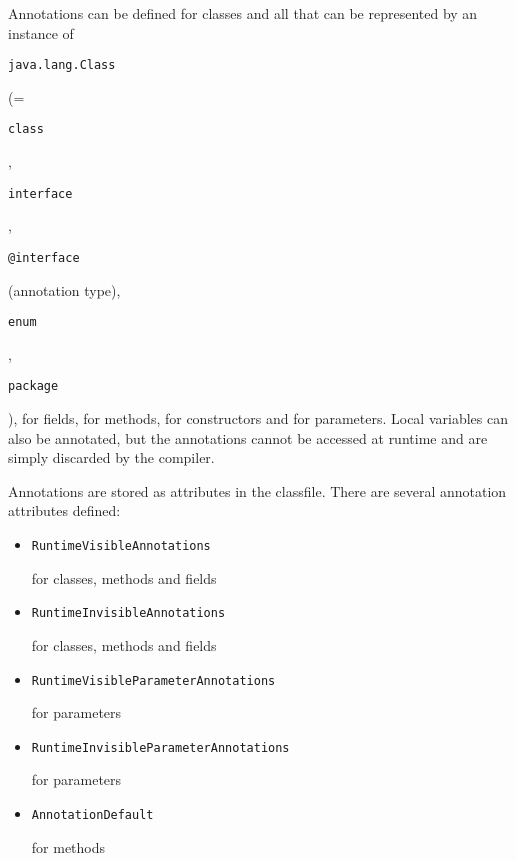 \documentclass[a4paper, 10pt, titlepage]{scrartcl} %
\begin{document}
Annotations can be defined for classes and all that can be represented by an
instance of \begin{scriptsize}\verb|java|\hspace{0.0pt}\verb|.|\hspace{0.0pt}\verb|lang|\hspace{0.0pt}\verb|.|\hspace{0.0pt}\verb|Class|\end{scriptsize} (=\begin{scriptsize}\verb|class|\end{scriptsize}, \begin{scriptsize}\verb|interface|\end{scriptsize},
\begin{scriptsize}\verb||\hspace{0.0pt}\verb|@|\hspace{0.0pt}\verb|interface|\end{scriptsize} (annotation type), \begin{scriptsize}\verb|enum|\end{scriptsize}, \begin{scriptsize}\verb|package|\end{scriptsize}), for fields, for
methods, for constructors and for parameters. Local variables can also be
annotated, but the annotations cannot be accessed at runtime and are simply
discarded by the compiler.

Annotations are stored as attributes in the classfile. There are several
annotation attributes defined:
\begin{itemize}
 \item \begin{scriptsize}\verb|RuntimeVisibleAnnotations|\end{scriptsize} for classes, methods and fields
 \item \begin{scriptsize}\verb|RuntimeInvisibleAnnotations|\end{scriptsize} for classes, methods and fields
 \item \begin{scriptsize}\verb|RuntimeVisibleParameterAnnotations|\end{scriptsize} for parameters
 \item \begin{scriptsize}\verb|RuntimeInvisibleParameterAnnotations|\end{scriptsize} for parameters
 \item \begin{scriptsize}\verb|AnnotationDefault|\end{scriptsize} for methods
\end{itemize}
\end{document}
